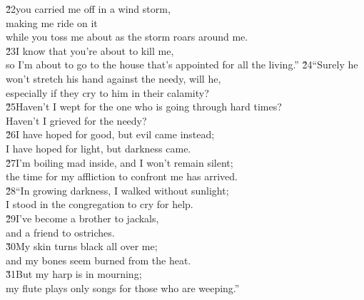\begin{poetry}
\poeml \v{22}you carried me off in a wind storm, \\
\poemll    making me ride on it \\
\poemlll       while you toss me about as the storm roars around me. \\
\poeml \v{23}I know that you're about to kill me, \\
\poemll    so I'm about to go to the house that's appointed for all the living.''
\poeml \v{24}``Surely he won't stretch his hand against the needy, will he, \\
\poemll    especially if they cry to him in their calamity? \\
\poeml \v{25}Haven't I wept for the one who is going through hard times? \\
\poemll    Haven't I grieved for the needy? \\
\poeml \v{26}I have hoped for good, but evil came instead; \\
\poemll    I have hoped for light, but darkness came. \\
\poeml \v{27}I'm boiling mad inside, and I won't remain silent; \\
\poemll    the time for my affliction to confront me has arrived. \\
\poeml \v{28}``In growing darkness, I walked without sunlight; \\
\poemll    I stood in the congregation to cry for help. \\
\poeml \v{29}I've become a brother to jackals, \\
\poemll    and a friend to ostriches. \\
\poeml \v{30}My skin turns black all over me; \\
\poemll    and my bones seem burned from the heat. \\
\poeml \v{31}But my harp is in mourning; \\
\poemll    my flute plays only songs for those who are weeping.''
\end{poetry}

